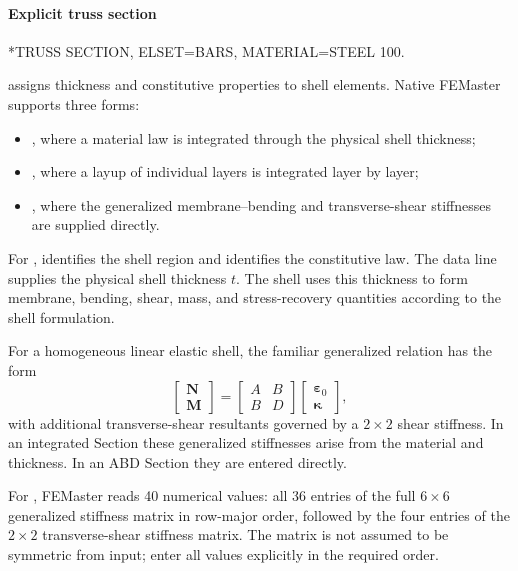 \paragraph*{Explicit truss section}
\begin{inputdeck}
*TRUSS SECTION, ELSET=BARS, MATERIAL=STEEL
100.
\end{inputdeck}


 assigns thickness and constitutive properties to shell elements. Native FEMaster supports three forms:
\begin{itemize}
  \item {}, where a material law is integrated through the physical shell thickness;
  \item {}, where a layup of individual layers is integrated layer by layer;
  \item {}, where the generalized membrane--bending and transverse-shear stiffnesses are supplied directly.
\end{itemize}

For ,  identifies the shell region and  identifies the constitutive law. The data line supplies the physical shell thickness \(t\). The shell uses this thickness to form membrane, bending, shear, mass, and stress-recovery quantities according to the shell formulation.

For a homogeneous linear elastic shell, the familiar generalized relation has the form
\[
\begin{bmatrix}
\boldsymbol N\\
\boldsymbol M
\end{bmatrix}
=
\begin{bmatrix}
A & B\\
B & D
\end{bmatrix}
\begin{bmatrix}
\boldsymbol\varepsilon_0\\
\boldsymbol\kappa
\end{bmatrix},
\]
with additional transverse-shear resultants governed by a \(2\times2\) shear stiffness. In an integrated Section these generalized stiffnesses arise from the material and thickness. In an ABD Section they are entered directly.

For , FEMaster reads 40 numerical values: all 36 entries of the full \(6\times6\) generalized stiffness matrix in row-major order, followed by the four entries of the \(2\times2\) transverse-shear stiffness matrix. The matrix is not assumed to be symmetric from input; enter all values explicitly in the required order.

